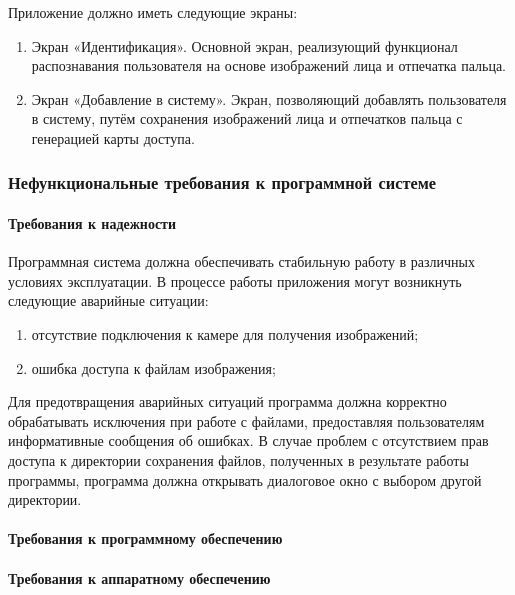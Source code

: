  Приложение должно иметь следующие экраны:
 
 \begin{enumerate}
 	\item Экран «Идентификация». Основной экран, реализующий
 	функционал распознавания пользователя на основе изображений лица и отпечатка пальца.
 	\item Экран «Добавление в систему». Экран, позволяющий добавлять пользователя в систему, путём сохранения изображений лица и отпечатков пальца с генерацией карты доступа.
 \end{enumerate}


\subsubsection{Нефункциональные требования к программной системе}

\paragraph {Требования к надежности}

Программная система должна обеспечивать стабильную работу в различных условиях эксплуатации. В процессе работы приложения могут возникнуть следующие аварийные ситуации:
\begin{enumerate}
	\item отсутствие подключения к камере для получения изображений;
	\item ошибка доступа к файлам изображения;
\end{enumerate}

Для предотвращения аварийных ситуаций программа должна корректно обрабатывать исключения при работе с файлами, предоставляя пользователям информативные сообщения об ошибках. В случае проблем с отсутствием прав доступа к директории сохранения файлов, полученных в результате работы программы, программа должна открывать диалоговое окно с выбором другой директории.

\paragraph {Требования к программному обеспечению}



\paragraph {Требования к аппаратному обеспечению}



